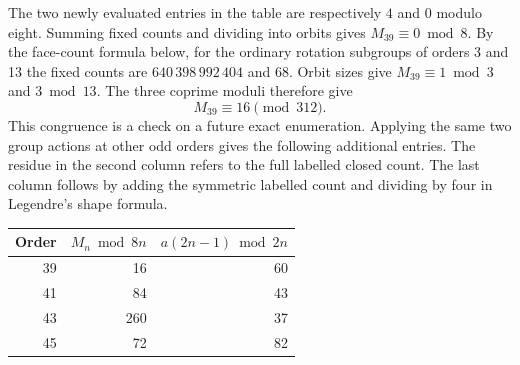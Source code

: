The two newly evaluated entries in the table are respectively \(4\) and \(0\) modulo eight. Summing fixed counts and dividing into orbits gives \(M_{39}\equiv0\bmod8\). By the face-count formula below, for the ordinary rotation subgroups of orders 3 and 13 the fixed counts are \(640\,398\,992\,404\) and \(68\). Orbit sizes give \(M_{39}\equiv1\bmod3\) and \(3\bmod13\). The three coprime moduli therefore give
\[
 \boxed{M_{39}\equiv16\pmod{312}}.
\]
This congruence is a check on a future exact enumeration. Applying the same two group actions at other odd orders gives the following additional entries. The residue in the second column refers to the full labelled closed count. The last column follows by adding the symmetric labelled count and dividing by four in Legendre's shape formula.
\begin{center}\begin{tabular}{rrr}\toprule
Order & \(M_n\bmod 8n\)&\(a(2n-1)\bmod 2n\)\\\midrule
39 & 16 & 60\\
41 & 84 & 43\\
43 & 260 & 37\\
45 & 72 & 82\\
\bottomrule\end{tabular}\end{center}


